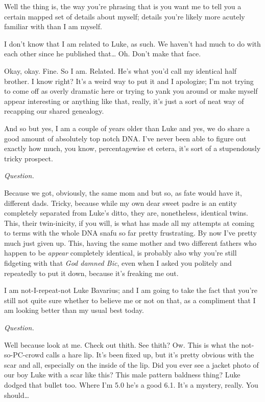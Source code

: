 Well the thing is, the way you're phrasing that is you want
me to tell you a certain mapped set of details about myself;
details you're likely more acutely familiar with than I am
myself.

I don't know that I am related to Luke, as such. We
haven't had much to do with each other since he published
that{\ldots} Oh. Don't make that face.

Okay, okay. Fine. So I am. Related. He's what you'd
call my identical half brother. I know right? It's a weird
way to put it and I apologize; I'm not trying to come off as
overly dramatic here or trying to yank you around or make myself
appear interesting or anything like that, really, it's just a
sort of neat way of recapping our shared genealogy.

And so but yes, I am a couple of years older than Luke and yes, we
do share a good amount of absolutely top notch DNA. I've
never been able to figure out exactly how much, you know,
percentagewise et cetera, it's sort of a stupendously tricky
prospect.



{\em Question.}



Because we got, obviously, the same mom and but so, as fate would
have it, different dads. Tricky, because while my own dear sweet
padre is an entity completely separated from Luke's ditto,
they are, nonetheless, identical twins. This, their twin-inicity,
if you will, is what has made all my attempts at coming to terms
with the whole DNA snafu so far pretty frustrating. By now
I've pretty much just given up. This, having the same mother
and two different fathers who happen to be {\em appear} completely
identical, is probably also why you're still fidgeting with
that {\em God damned Bic}, even when I asked you politely and
repeatedly to put it down, because it's freaking me
out.

I am not-I-repeat-not Luke Bavarius; and I am going to take the
fact that you're still not quite sure whether to believe me
or not on that, as a compliment that I am looking better than my
usual best today.



{\em Question.}



Well because look at me. Check out thith. See thith? Ow. This is
what the not-so-PC-crowd calls a hare lip. It's been fixed
up, but it's pretty obvious with the scar and all, especially
on the inside of the lip. Did you ever see a jacket photo of our
boy Luke with a scar like this? This male pattern baldness thing?
Luke dodged that bullet too. Where I'm 5.0 he's a good
6.1. It's a mystery, really. You should{\ldots}



